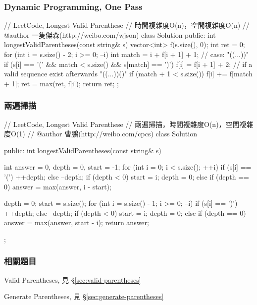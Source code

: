 \subsubsection{Dynamic Programming, One Pass}
\begin{Code}
// LeetCode, Longest Valid Parenthese
// 時間複雜度O(n)，空間複雜度O(n)
// @author 一隻傑森(http://weibo.com/wjson)
class Solution {
public:
    int longestValidParentheses(const string& s) {
        vector<int> f(s.size(), 0);
        int ret = 0;
        for (int i = s.size() - 2; i >= 0; --i) {
            int match = i + f[i + 1] + 1;
            // case: "((...))"
            if (s[i] == '(' && match < s.size() && s[match] == ')') {
                f[i] = f[i + 1] + 2;
                // if a valid sequence exist afterwards "((...))()"
                if (match + 1 < s.size()) f[i] += f[match + 1];
            }
            ret = max(ret, f[i]);
        }
        return ret;
    }
};
\end{Code}


\subsubsection{兩遍掃描}
\begin{Code}
// LeetCode, Longest Valid Parenthese
// 兩遍掃描，時間複雜度O(n)，空間複雜度O(1)
// @author 曹鵬(http://weibo.com/cpcs)
class Solution {
public:
    int longestValidParentheses(const string& s) {
        int answer = 0, depth = 0, start = -1;
        for (int i = 0; i < s.size(); ++i) {
            if (s[i] == '(') {
                ++depth;
            } else {
                --depth;
                if (depth < 0) {
                    start = i;
                    depth = 0;
                } else if (depth == 0) {
                    answer = max(answer, i - start);
                }
            }
        }

        depth = 0;
        start = s.size();
        for (int i = s.size() - 1; i >= 0; --i) {
            if (s[i] == ')') {
                ++depth;
            } else {
                --depth;
                if (depth < 0) {
                    start = i;
                    depth = 0;
                } else if (depth == 0) {
                    answer = max(answer, start - i);
                }
            }
        }
        return answer;
    }
};
\end{Code}


\subsubsection{相關題目}
\begindot
\item Valid Parentheses, 見 \S \ref{sec:valid-parentheses}
\item Generate Parentheses, 見 \S \ref{sec:generate-parentheses}
\myenddot


